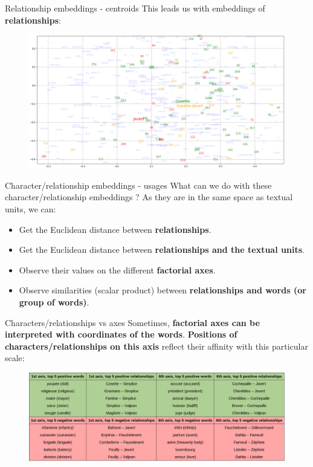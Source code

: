 \documentclass[10pt]{beamer}
\newcommand{\imp}[1]{\textbf{\color{cyan}#1}}
\begin{document}
	\begin{frame}{Relationship embeddings - centroids}
		This leads us with embeddings of \imp{relationships}:
		\begin{figure}
			\centering
			\includegraphics[width=\textwidth]{img/occ_embeddings.png}
		\end{figure}
	\end{frame}
	
	
	\begin{frame}{Character/relationship embeddings - usages}
		What can we do with these character/relationship embeddings ? As they are in the same space as textual units, we can: 
		\begin{itemize}
			\item Get the Euclidean distance between \imp{relationships}.
			\item Get the Euclidean distance between \imp{relationships and the textual units}.
			\item Observe their values on the different \imp{factorial axes}. 
			\item Observe similarities (scalar product) between \imp{relationships and words (or group of words)}.
		\end{itemize}
	\end{frame}
	
	
	\begin{frame}{Characters/relationships vs axes}
		Sometimes, \imp{factorial axes can be interpreted with coordinates of the words}. \imp{Positions of characters/relationships on this axis} reflect their affinity with this particular scale:
		\begin{figure}
			\centering
			\includegraphics[width=\textwidth]{img/relationship_vs_axes.png}
		\end{figure}
	\end{frame}
	
\end{document}
